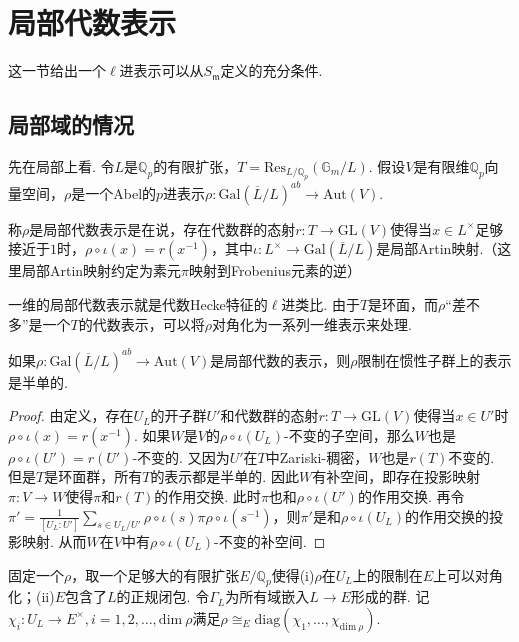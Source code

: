 \section{局部代数表示}

这一节给出一个$\ell$进表示可以从$S_{\mathfrak{m}}$定义的充分条件.

\subsection*{局部域的情况}
先在局部上看. 令$L$是$\mathbb{Q}_p$的有限扩张，$T = \mathrm{Res}_{L/\mathbb{Q}_p}(\mathbb{G}_m / L)$.
假设$V$是有限维$\mathbb{Q}_p$向量空间，$\rho$是一个Abel的$p$进表示$\rho: \mathrm{Gal}(\overline{L}/L)^{ab} \to \mathrm{Aut}(V)$.

\begin{cdef}
    称$\rho$是局部代数表示是在说，存在代数群的态射$r:T\to \mathrm{GL}(V)$使得当$x\in L^{\times}$足够接近于$1$时，$\rho\circ \iota(x) = r(x^{-1})$，其中$\iota: L^{\times}\to \mathrm{Gal}(\overline{L}/L) $是局部Artin映射.（这里局部Artin映射约定为素元$\pi$映射到Frobenius元素的逆）
\end{cdef}

一维的局部代数表示就是代数Hecke特征的$\ell$进类比. 由于$T$是环面，而$\rho$“差不多”是一个$T$的代数表示，可以将$\rho$对角化为一系列一维表示来处理.

\begin{cprop}
    如果$\rho: \mathrm{Gal}(\overline{L}/L)^{ab} \to \mathrm{Aut}(V)$是局部代数的表示，则$\rho$限制在惯性子群上的表示是半单的.
\end{cprop}

\begin{proof}
    由定义，存在$U_L$的开子群$U'$和代数群的态射$r: T\to \mathrm{GL}(V)$使得当$x\in U'$时$\rho\circ \iota(x) = r(x^{-1})$. 如果$W$是$V$的$\rho\circ\iota(U_L)$-不变的子空间，那么$W$也是$\rho\circ\iota(U')=r(U')$-不变的. 又因为$U'$在$T$中Zariski-稠密，$W$也是$r(T)$不变的. 但是$T$是环面群，所有$T$的表示都是半单的. 因此$W$有补空间，即存在投影映射$\pi: V\to W$使得$\pi$和$r(T)$的作用交换. 此时$\pi$也和$\rho\circ\iota(U')$的作用交换. 再令$\pi' = \frac{1}{[U_L:U']} \sum_{s\in U_L/U'} \rho\circ \iota(s) \pi \rho\circ \iota(s^{-1})$，则$\pi'$是和$\rho\circ\iota(U_L)$的作用交换的投影映射. 从而$W$在$V$中有$\rho\circ\iota(U_L)$-不变的补空间.
\end{proof}

固定一个$\rho$，取一个足够大的有限扩张$E/\mathbb{Q}_p$使得(i)$\rho$在$U_L$上的限制在$E$上可以对角化；(ii)$E$包含了$L$的正规闭包. 令$\Gamma_{L}$为所有域嵌入$L\to E$形成的群. 记$\chi_i: U_L\to E^{\times}, i=1,2,\ldots,\mathrm{dim}\ \rho$满足$\rho \cong_{E} \mathrm{diag}(\chi_1,\ldots, \chi_{\mathrm{dim}\ \rho})$.

